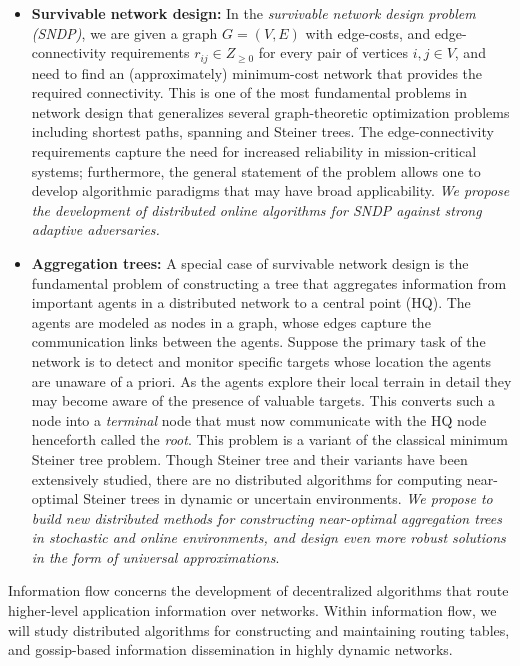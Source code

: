 \begin{itemize}
\item
{\bf Survivable network design:} In the {\em survivable network design
  problem (SNDP)}, we are given a graph $G = (V,E)$ with edge-costs,
and edge-connectivity requirements $r_{ij} \in Z_{\ge 0}$ for every
pair of vertices $i, j \in V$, and need to find an (approximately)
minimum-cost network that provides the required connectivity.  This is
one of the most fundamental problems in network design that
generalizes several graph-theoretic optimization problems including
shortest paths, spanning and Steiner trees.  The edge-connectivity
requirements capture the need for increased reliability in
mission-critical systems; furthermore, the general statement of the
problem allows one to develop algorithmic paradigms that may have
broad applicability. {\em We propose the development of distributed
  online algorithms for SNDP against strong adaptive adversaries.}

\item
{\bf Aggregation trees:} A special case of survivable network design
is the fundamental problem of constructing a tree that aggregates
information from important agents in a distributed network to a
central point (HQ). The agents are modeled as nodes in a graph, whose
edges capture the communication links between the agents.  Suppose the
primary task of the network is to detect and monitor specific targets
whose location the agents are unaware of a priori.  As the agents
explore their local terrain in detail they may become aware of the
presence of valuable targets. This converts such a node into a {\em
  terminal} node that must now communicate with the HQ node henceforth
called the {\em root}.  This problem is a variant of the classical
minimum Steiner tree problem.  Though Steiner tree and their variants
have been extensively studied, there are no distributed algorithms for
computing near-optimal Steiner trees in dynamic or uncertain
environments.  {\em We propose to build new distributed methods for
  constructing near-optimal aggregation trees in stochastic and online
  environments, and design even more robust solutions in the form of
  universal approximations}.
\end{itemize}

Information flow concerns the development of decentralized algorithms
that route higher-level application information over networks.  Within
information flow, we will study distributed algorithms for
constructing and maintaining routing tables, and gossip-based
information dissemination in highly dynamic networks.

